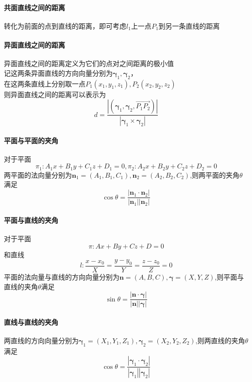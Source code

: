 \documentclass{article}
\newcommand{\ve}{\boldsymbol}
\begin{document}
\begin{CJK}{UTF8}{gkai}
\paragraph{共面直线之间的距离\\}
转化为前面的点到直线的距离，即可考虑$l_1$上一点$P_1$到另一条直线的距离\\

\paragraph{异面直线之间的距离\\}
异面直线之间的距离定义为它们的点对之间距离的极小值\\
记这两条异面直线的方向向量分别为$\ve{\gamma}_1,\ve{\gamma}_2$，\\
在这两条直线上分别取一点$P_1(x_1,y_1,z_1),P_2(x_2,y_2,z_2)$\\
则异面直线之间的距离可以表示为\\
\[d=\frac{\left|{(\ve{\gamma}_1,\ve{\gamma}_2,\overrightarrow{P_1P_2})}\right|}
{\left|{\ve{\gamma}_1\times \ve{\gamma}_2}\right|}\]


\paragraph{平面与平面的夹角\\}
对于平面
\[\pi_1:A_1x+B_1y+C_1z+D_1=0,\pi_2:A_2x+B_2y+C_2z+D_2=0\]
两平面的法向量分别为$\ve{n}_1=(A_1,B_1,C_1),\ve{n}_2=(A_2,B_2,C_2)$,则两平面的夹角$\theta$满足\\
\[\cos\theta=\frac{\left|{\ve{n}_1}\cdot{\ve{n}_2}\right|} {\left|{\ve{n}_1}\right|\left|{\ve{n}_2}\right|}\]

\paragraph{平面与直线的夹角\\}
对于平面
\[\pi:Ax+By+Cz+D=0\]
和直线
\[l:\frac{x-x_0}{X}=\frac{y-y_0}{Y}=\frac{z-z_0}{Z}=0\]
平面的法向量与直线的方向向量分别为$\ve{n}=(A,B,C),\ve{\gamma}=(X,Y,Z)$,则平面与直线的夹角$\theta$满足\\
\[\sin\theta=\frac{\left|{\ve{n}}\cdot{\ve{\gamma}}\right|} {\left|{\ve{n}}\right|\left|{\ve{\gamma}}\right|}\]

\paragraph{直线与直线的夹角\\}
两直线的方向向量分别为$\ve{\gamma}_1=(X_1,Y_1,Z_1),\ve{\gamma}_2=(X_2,Y_2,Z_2)$,则两直线的夹角$\theta$满足\\
\[\cos\theta=\frac{\left|{\ve{\gamma}_1}\cdot{\ve{\gamma}_2}\right|} {\left|{\ve{\gamma}_1}\right|\left|{\ve{\gamma}_2}\right|}\]


\end{CJK}
\end{document}
